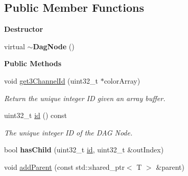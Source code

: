 \subsection*{Public Member Functions}
\begin{Indent}\textbf{ Destructor}\par
\begin{DoxyCompactItemize}
\item 
\mbox{\label{classrev_1_1_dag_node_ac24b2462775bf37e97070d9cd4dcd51f}} 
virtual {\bfseries $\sim$\+Dag\+Node} ()
\end{DoxyCompactItemize}
\end{Indent}
\begin{Indent}\textbf{ Public Methods}\par
\begin{DoxyCompactItemize}
\item 
\mbox{\label{classrev_1_1_dag_node_a0eeab3282b999e849d5d2382192a1e79}} 
void \mbox{\hyperlink{classrev_1_1_dag_node_a0eeab3282b999e849d5d2382192a1e79}{get3\+Channel\+Id}} (uint32\+\_\+t $\ast$color\+Array)
\begin{DoxyCompactList}\small\item\em Return the unique integer ID given an array buffer. \end{DoxyCompactList}\item 
\mbox{\label{classrev_1_1_dag_node_affc1f6a97703f3187ad0159709bb0681}} 
uint32\+\_\+t \mbox{\hyperlink{classrev_1_1_dag_node_affc1f6a97703f3187ad0159709bb0681}{id}} () const
\begin{DoxyCompactList}\small\item\em The unique integer ID of the D\+AG Node. \end{DoxyCompactList}\item 
\mbox{\label{classrev_1_1_dag_node_ad3ffe647fe4ebd01a43cd414717e5353}} 
bool {\bfseries has\+Child} (uint32\+\_\+t \mbox{\hyperlink{classrev_1_1_dag_node_affc1f6a97703f3187ad0159709bb0681}{id}}, uint32\+\_\+t \&out\+Index)
\item 
\mbox{\label{classrev_1_1_dag_node_ab6eb9cc62005adf59ac892bfb995b4fb}} 
void \mbox{\hyperlink{classrev_1_1_dag_node_ab6eb9cc62005adf59ac892bfb995b4fb}{add\+Parent}} (const std\+::shared\+\_\+ptr$<$ T $>$ \&parent)

\end{DoxyCompactItemize}
\end{Indent}
